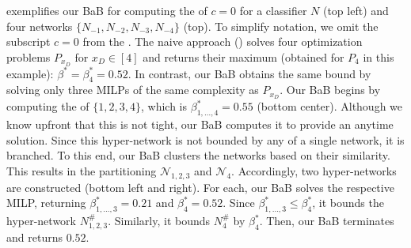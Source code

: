  exemplifies our BaB for computing the \propa of $c=0$ for a classifier $N$ (top %
left) %
 and four networks $\{N_{-1}, N_{-2}, N_{-3}, N_{-4}\}$ (top). %
To simplify notation, we omit the subscript $c=0$ from the \propa.
The naive approach () solves four optimization problems $P_{x_D}$ for $x_D \in [4]$ and returns their maximum (obtained for $P_4$ in this example): $\beta^* = \beta^*_4=0.52$. 
In contrast, our BaB obtains the same bound by solving only three MILPs of the same complexity as $P_{x_D}$. Our BaB begins by computing the \propa of $\{1,2,3,4\}$, which is $\beta^*_{1,\ldots,4}=0.55$ (bottom center).
Although we know upfront that this \propa is not tight, our BaB computes it to provide an anytime solution. %
Since this hyper-network is not bounded by any \propa of a single network, it is branched.  
To this end, our BaB clusters the networks based on their similarity. This results in the partitioning $\mathcal{N}_{1,2,3}$ and $\mathcal{N}_{4}$. Accordingly, two hyper-networks are constructed (bottom left and right). 
For each, our BaB solves the respective MILP, returning $\beta^*_{1,\ldots,3}=0.21$ and $\beta^*_{4} =0.52$. Since 
 $\beta^*_{1,\ldots,3}\leq\beta^*_4$, it bounds the hyper-network ${N}^\#_{1,2,3}$. Similarly, it bounds ${N}^\#_4$ by $\beta^*_{4} $.  
Then, our BaB terminates and returns $0.52$.




